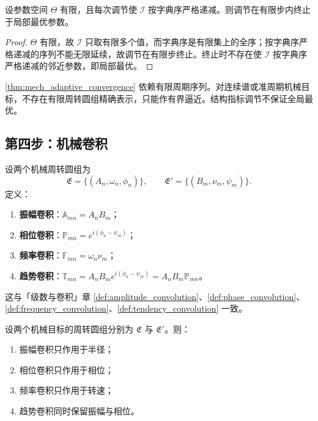 \begin{proposition}[结构指标调节的有限收敛]\label{prop:mech_structure_metric_convergence}
设参数空间 $\Theta$ 有限，且每次调节使 $\mathcal I$ 按字典序严格递减。则调节在有限步内终止于局部最优参数。
\end{proposition}

\begin{proof}
$\Theta$ 有限，故 $\mathcal I$ 只取有限多个值，而字典序是有限集上的全序；按字典序严格递减的序列不能无限延续，故调节在有限步终止。终止时不存在使 $\mathcal I$ 按字典序严格递减的邻近参数，即局部最优。
\end{proof}

\begin{remark}[动态调节的边界]\label{rem:mech_adaptive_boundary}
\cref{thm:mech_adaptive_convergence} 依赖有限周期序列。对连续谱或准周期机械目标，不存在有限周转圆组精确表示，只能作有界逼近。结构指标调节不保证全局最优。
\end{remark}

\subsection{第四步：机械卷积}

\begin{definition}\label{def:mech_convolution_types}
设两个机械周转圆组为
\[
\mathfrak E=\{(A_n,\omega_n,\phi_n)\},\qquad
\mathfrak E'=\{(B_m,\nu_m,\psi_m)\}.
\]
定义：
\begin{enumerate}[label=(\roman*)]
    \item \textbf{振幅卷积}：$\mathbb A_{mn}=A_nB_m$；
    \item \textbf{相位卷积}：$\mathbb P_{mn}=e^{i(\phi_n-\psi_m)}$；
    \item \textbf{频率卷积}：$\mathbb F_{mn}=\omega_n\nu_m$；
    \item \textbf{趋势卷积}：$\mathbb T_{mn}=A_nB_m e^{i(\phi_n-\psi_m)}=A_nB_m\mathbb P_{mn}$。
\end{enumerate}
这与「级数与卷积」章 \cref{def:amplitude_convolution}、\cref{def:phase_convolution}、\cref{def:frequency_convolution}、\cref{def:tendency_convolution} 一致。
\end{definition}

\begin{theorem}[三类卷积在机械周转圆组上的作用]\label{thm:mech_convolution_action}
设两个机械目标的周转圆组分别为 $\mathfrak E$ 与 $\mathfrak E'$。则：
\begin{enumerate}[label=(\roman*)]
    \item 振幅卷积只作用于半径；
    \item 相位卷积只作用于相位；
    \item 频率卷积只作用于转速；
    \item 趋势卷积同时保留振幅与相位。
\end{enumerate}
\end{theorem}

